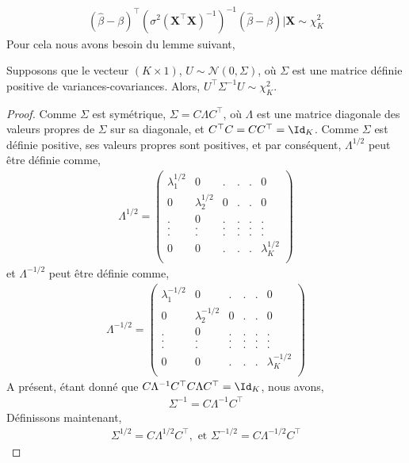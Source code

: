 \begin{align}
(\widehat{\beta}-\beta)^\top\left(\sigma^2(\mathbf{X}^\top\mathbf{X})^{-1}
\right)^{-1}
(\widehat{\beta}-\beta) | \mathbf{X}\sim \chi^2_K
\label{eq30}
\end{align}
Pour cela nous avons besoin du lemme suivant,
\begin{lemme}
Supposons que le vecteur $(K\times 1)$, $U\sim\mathcal{N}(0, \Sigma)$, où $\Sigma$ est une matrice définie positive de variances-covariances. Alors, $U^\top\Sigma^{-1}U\sim\chi^2_K$.
\label{le2}
\end{lemme}
\begin{proof}
Comme $\Sigma$ est symétrique, $\Sigma = C\Lambda C^\top$, où $\Lambda$ est une matrice diagonale des valeurs propres de $\Sigma$ sur sa diagonale, et $C^\top C=CC^\top=\Id_K$. Comme $\Sigma$ est définie positive, ses valeurs propres sont positives, et par conséquent, $\Lambda^{1/2}$ peut être définie comme,
\begin{align*}
\Lambda^{1/2}=
\left(
\begin{array}{cccccc}
\lambda_1^{1/2}&0&.&.&.&0\\
0&\lambda_2^{1/2}&0&.&.&0\\
.&0&.&.&.&.\\
.&.&.&.&.&.\\
.&.&.&.&.&.\\
0&0&.&.&.&\lambda_K^{1/2}\\
\end{array}
\right)
\end{align*}
et $\Lambda^{-1/2}$ peut être définie comme,
\begin{align*}
\Lambda^{-1/2}=
\left(
\begin{array}{cccccc}
\lambda_1^{-1/2}&0&.&.&.&0\\
0&\lambda_2^{-1/2}&0&.&.&0\\
.&0&.&.&.&.\\
.&.&.&.&.&.\\
.&.&.&.&.&.\\
0&0&.&.&.&\lambda_K^{-1/2}\\
\end{array}
\right)
\end{align*}
A présent, \'etant donné que $C\Lambda^{-1}C^\top C\Lambda C^\top = \Id_K$, nous avons,
\begin{align*}
\Sigma^{-1} = C\Lambda^{-1}C^\top
\end{align*}
Définissons maintenant,
\begin{align*}
\Sigma^{1/2} = C\Lambda^{1/2}C^\top, \textrm{ \ et \ } \Sigma^{-1/2} = C\Lambda^{-1/2}C^\top

\end{align*}
\end{proof}
